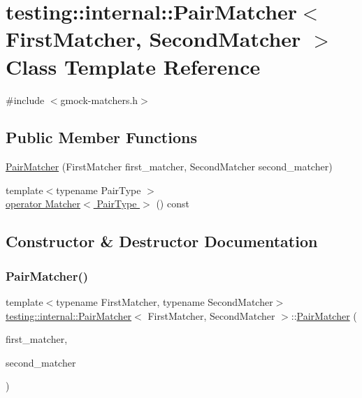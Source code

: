 \hypertarget{classtesting_1_1internal_1_1_pair_matcher}{}\section{testing\+:\+:internal\+:\+:Pair\+Matcher$<$ First\+Matcher, Second\+Matcher $>$ Class Template Reference}
\label{classtesting_1_1internal_1_1_pair_matcher}


{\ttfamily \#include $<$gmock-\/matchers.\+h$>$}

\subsection*{Public Member Functions}
\begin{DoxyCompactItemize}
\item 
\hyperlink{classtesting_1_1internal_1_1_pair_matcher_a84f233a7d90ba33e3f0eb7410783c43c}{Pair\+Matcher} (First\+Matcher first\+\_\+matcher, Second\+Matcher second\+\_\+matcher)
\item 
{\footnotesize template$<$typename Pair\+Type $>$ }\\\hyperlink{classtesting_1_1internal_1_1_pair_matcher_ae9461cc22148c6b15ad94eb5ad7c8a50}{operator Matcher$<$ Pair\+Type $>$} () const
\end{DoxyCompactItemize}


\subsection{Constructor \& Destructor Documentation}
\mbox{\label{classtesting_1_1internal_1_1_pair_matcher_a84f233a7d90ba33e3f0eb7410783c43c}} 
\subsubsection{\texorpdfstring{Pair\+Matcher()}{PairMatcher()}}
{\footnotesize\ttfamily template$<$typename First\+Matcher, typename Second\+Matcher$>$ \\
\hyperlink{classtesting_1_1internal_1_1_pair_matcher}{testing\+::internal\+::\+Pair\+Matcher}$<$ First\+Matcher, Second\+Matcher $>$\+::\hyperlink{classtesting_1_1internal_1_1_pair_matcher}{Pair\+Matcher} (\begin{DoxyParamCaption}\item[{First\+Matcher}]{first\+\_\+matcher,  }\item[{Second\+Matcher}]{second\+\_\+matcher }\end{DoxyParamCaption})\hspace{0.3cm}{\ttfamily [inline]}}



